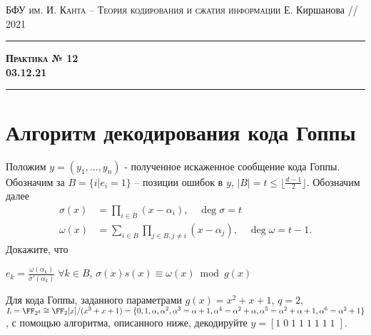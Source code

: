 \documentclass[11pt]{exam}
\theoremstyle{definition}
\newcommand*\abs[1]{\left\lvert#1\right\rvert}
\begin{document}
	{\noindent
		\textsc{БФУ им. И. Канта -- Теория кодирования и сжатия информации}
		\hfill {Е. Киршанова // 2021\\}
	\hrule
	\begin{center}
		{\Large\textbf{
				\textsc{Практика № 12} \\[5pt] {03.12.21}
		} } 
	\end{center}
	\hrule \vspace{5mm}
	
	\thispagestyle{empty}
	
	\vspace{0.2cm}
	
		
	
\section{Алгоритм декодирования кода Гоппы}
		Положим $y = (y_1, \ldots, y_n)$ - полученное искаженное сообщение кода Гоппы. Обозначим за $B = \{ i \vert e_i = 1\}$ -- позиции ошибок в $y$, $\abs{B} = t \leq \lfloor \frac{d-1}{2} \rfloor$. Обозначим далее
		\begin{align*}
				\sigma(x) &= \prod_{i \in B} (x - \alpha_i), \quad \deg \sigma = t \\
				\omega(x) & = \sum_{i \in B} \prod_{j \in B, j \neq i} (x - \alpha_j), \quad \deg \omega = t-1.
		\end{align*}
		Докажите, что
		\begin{questions}
 		\question $e_k = \frac{\omega(\alpha_k)}{\sigma'(\alpha_k)} \; \forall k \in B$,
 		\question  $\sigma(x)s(x) \equiv \omega(x) \bmod g(x)$
 		\end{questions}
 	
 		Для кода Гоппы, заданного параметрами  $g(x) = x^2+x+1$, $q=2$, $L = \FF_{2^3} \cong \FF_2[x]/(x^3+x+1)  = \{ 0, 1, \alpha, \alpha^2, \alpha^3 = \alpha+1, \alpha^4 = \alpha^2 + \alpha, \alpha^5 = \alpha^2 + \alpha+1, \alpha^6 = \alpha^2+1 \}$, с помощью алгоритма, описанного ниже, декодируйте $y = [1 \; 0\; 1\; 1\; 1\; 1\; 1\; 1\;]$. \\
 		
}
\end{document}
